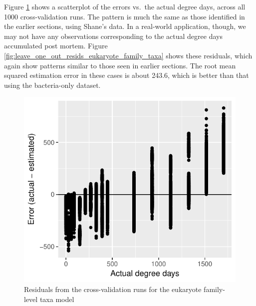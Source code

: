 \documentclass{article}
\begin{document}
Figure \ref{fig:resids_cv_eukaryote_family_taxa} shows a scatterplot
of the errors vs.~the actual degree days, across all 1000
cross-validation runs.  The pattern is much the same as those
identified in the earlier sections, using Shane's data.  In a
real-world application, though, we may not have any observations
corresponding to the actual degree days accumulated post mortem.
Figure \ref{fig:leave_one_out_resids_eukaryote_family_taxa} shows
these residuals, which again show patterns similar to those seen in
earlier sections.  The root mean squared estimation error in these
cases is about 243.6, which is better than that using the
bacteria-only dataset.

\begin{figure}
  \centering
  \includegraphics{../../../eukaryote_data/only_families/all_time_steps/hit_1perc_twice/orig_units_all_data_families_residuals}
  \caption{Residuals from the cross-validation runs for the eukaryote family-level taxa model}
  \label{fig:resids_cv_eukaryote_family_taxa}
\end{figure}
\end{document}
